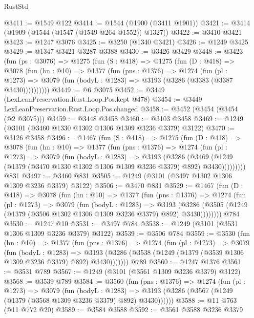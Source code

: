 \begin{lexlean}{RustStd}
\begin{coremodule}
@3411 := @1549 @122
@3414 := @1544 (@1900 (@3411 @1901))
@3421 := @3414 (@1909 (@1544 (@1547 (@1549 @264 @1552)) @1327))
@3422 := @3410 @3421
@3423 := @1247 @3076
@3425 := @3250 (@1340 @3421)
@3426 := @1249 @3425
@3429 := @1347 @3421 @3287 @3388
@3430 := @3426 @3429
@3448 := @3423
    (fun (ps : @3076) =>
    @1275
      (fun (S : @418) =>
      @1275
        (fun (D : @418) =>
        @3078
          (fun (hn : @10) =>
          @1377
            (fun (pns : @1376) =>
            @1274
              (fun (pl : @1273) =>
              @3079 (fun (bodyL : @1283) => @3193 (@3286 (@3383 (@3387 @3430))))))))))
@3449 := @6 @3075
@3452 := @3449 (LexLeanPreservation.Rust.Loop.Pos.kept @478)
@3454 := @3449 LexLeanPreservation.Rust.Loop.Pos.changed
@3458 := @3452 (@3454 (@3454 (@2 @3075)))
@3459 := @3448 @3458
@3460 := @3103 @3458
@3469 := @1249 (@3101 (@3460 @1330 @1302 @1306 @1309 @3236 @3379) @3122)
@3470 := @3126 @3458
@3496 := @1467
    (fun (S : @418) =>
    @1275
      (fun (D : @418) =>
      @3078
        (fun (hn : @10) =>
        @1377
          (fun (pns : @1376) =>
          @1274
            (fun (pl : @1273) =>
            @3079
              (fun (bodyL : @1283) =>
              @3193
                (@3286
                  (@3469
                    (@1249 (@1379 (@3470 @1330 @1302 @1306 @1309 @3236 @3379) @892) @3430)))))))))
    @831
@3497 := @3460 @831
@3505 := @1249 (@3101 (@3497 @1302 @1306 @1309 @3236 @3379) @3122)
@3506 := @3470 @831
@3529 := @1467
    (fun (D : @418) =>
    @3078
      (fun (hn : @10) =>
      @1377
        (fun (pns : @1376) =>
        @1274
          (fun (pl : @1273) =>
          @3079
            (fun (bodyL : @1283) =>
            @3193
              (@3286 (@3505 (@1249 (@1379 (@3506 @1302 @1306 @1309 @3236 @3379) @892) @3430))))))))
    @784
@3530 := @1247 @10
@3531 := @3497 @784
@3538 := @1249 (@3101 (@3531 @1306 @1309 @3236 @3379) @3122)
@3539 := @3506 @784
@3559 := @3530
    (fun (hn : @10) =>
    @1377
      (fun (pns : @1376) =>
      @1274
        (fun (pl : @1273) =>
        @3079
          (fun (bodyL : @1283) =>
          @3193 (@3286 (@3538 (@1249 (@1379 (@3539 @1306 @1309 @3236 @3379) @892) @3430)))))))
    @789
@3560 := @1247 @1376
@3561 := @3531 @789
@3567 := @1249 (@3101 (@3561 @1309 @3236 @3379) @3122)
@3568 := @3539 @789
@3584 := @3560
    (fun (pns : @1376) =>
    @1274
      (fun (pl : @1273) =>
      @3079
        (fun (bodyL : @1283) =>
        @3193 (@3286 (@3567 (@1249 (@1379 (@3568 @1309 @3236 @3379) @892) @3430))))))
@3588 := @11 @763 (@11 @772 @20)
@3589 := @3584 @3588
@3592 := @3561 @3588 @3236 @3379

\end{coremodule}
\end{lexlean}
